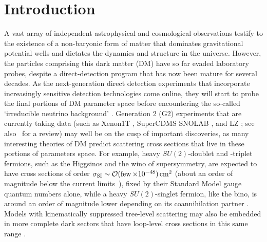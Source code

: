 \documentclass[11pt]{article}
\newcommand{\tenx}[1]{\times 10^{#1}}
\begin{document}
\maketitle

\section{Introduction} \setcounter{page}{2}

A vast array of independent astrophysical and cosmological observations testify to the existence of a non-baryonic form of matter that dominates gravitational potential wells and dictates the dynamics and structure in the universe. However, the particles comprising this dark matter (DM) have so far evaded laboratory probes, despite a direct-detection program that has now been mature for several decades. As the next-generation direct detection experiments that incorporate increasingly sensitive detection technologies come online, they will start to probe the final portions of DM parameter space before encountering the so-called `irreducible neutrino background' \cite{Bauer:2013ihz,Aprile:2015uzo,Agnese:2016cpb,Malling:2011va,Newstead:2013pea,Cushman:2013zza,Billard:2013qya,Ruppin:2014bra,Davis:2014ama,Dent:2016iht}. Generation 2 (G2) experiments that are currently taking data (such as Xenon1T \cite{Aprile:2015uzo}, SuperCDMS SNOLAB \cite{Agnese:2016cpb}, and LZ \cite{Malling:2011va}; see also~\cite{Bauer:2013ihz} for a review) may well be on the cusp of important discoveries, as many interesting theories of DM predict scattering cross sections that live in these portions of parameters space. For example, heavy $SU(2)$-doublet and -triplet fermions, such as the Higgsinos and the wino of supersymmetry, are expected to have cross sections of order $\sigma_{\rm SI} \sim \cO(\few\tenx{-48})\cm^2$ \cite{Hill:2011be,Hill:2013hoa,Hill:2014yxa} (about an order of magnitude below the current limits~\cite{Akerib:2016vxi,Tan:2016zwf}), fixed by their Standard Model gauge quantum numbers alone, while a heavy $SU(2)$-singlet fermion, like the bino, is around an order of magnitude lower depending on its coannihilation partner \cite{Berlin:2015njh}. Models with kinematically suppressed tree-level scattering may also be embedded in more complete dark sectors that have loop-level cross sections in this same range \cite{Ipek:2014gua,McDermott:2014rqa,Appelquist:2015yfa,Appelquist:2015zfa}.
\end{document}
